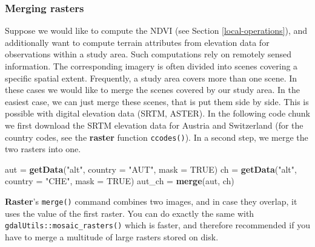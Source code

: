 \documentclass[]{krantz}
\newenvironment{Shaded}{\begin{snugshade}}{\end{snugshade}}
\newcommand{\DataTypeTok}[1]{\textcolor[rgb]{0.27,0.27,0.27}{#1}}
\newcommand{\KeywordTok}[1]{\textcolor[rgb]{0.27,0.27,0.27}{\textbf{#1}}}
\newcommand{\NormalTok}[1]{#1}
\newcommand{\OtherTok}[1]{\textcolor[rgb]{0.37,0.37,0.37}{#1}}
\newcommand{\StringTok}[1]{\textcolor[rgb]{0.5,0.5,0.5}{#1}}
\begin{document}
\hypertarget{merging-rasters}{%
\subsubsection{Merging rasters}\label{merging-rasters}}

Suppose we would like to compute the NDVI (see Section \ref{local-operations}), and additionally want to compute terrain attributes from elevation data for observations within a study area.
Such computations rely on remotely sensed information.
The corresponding imagery is often divided into scenes covering a specific spatial extent.
Frequently, a study area covers more than one scene.
In these cases we would like to merge the scenes covered by our study area.
In the easiest case, we can just merge these scenes, that is put them side by side.
This is possible with digital elevation data (SRTM, ASTER).
In the following code chunk we first download the SRTM elevation data for Austria and Switzerland (for the country codes, see the \textbf{raster} function \texttt{ccodes()}).
In a second step, we merge the two rasters into one.

\begin{Shaded}
\begin{Highlighting}[]
\NormalTok{aut =}\StringTok{ }\KeywordTok{getData}\NormalTok{(}\StringTok{"alt"}\NormalTok{, }\DataTypeTok{country =} \StringTok{"AUT"}\NormalTok{, }\DataTypeTok{mask =} \OtherTok{TRUE}\NormalTok{)}
\NormalTok{ch =}\StringTok{ }\KeywordTok{getData}\NormalTok{(}\StringTok{"alt"}\NormalTok{, }\DataTypeTok{country =} \StringTok{"CHE"}\NormalTok{, }\DataTypeTok{mask =} \OtherTok{TRUE}\NormalTok{)}
\NormalTok{aut_ch =}\StringTok{ }\KeywordTok{merge}\NormalTok{(aut, ch)}
\end{Highlighting}
\end{Shaded}

\textbf{Raster}'s \texttt{merge()} command combines two images, and in case they overlap, it uses the value of the first raster.
You can do exactly the same with \texttt{gdalUtils::mosaic\_rasters()} which is faster, and therefore recommended if you have to merge a multitude of large rasters stored on disk.
\end{document}
